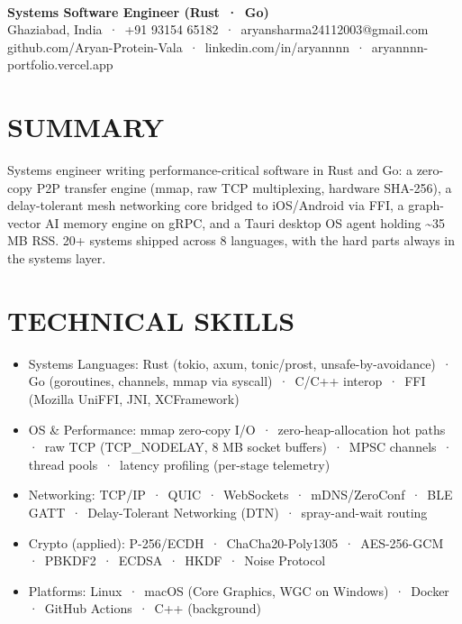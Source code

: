 \documentclass[9pt]{article}
\begin{document}
\\[3pt]
{\large\bfseries Systems Software Engineer (Rust \,·\, Go)}\\[3pt]
{\small\color{greyc} Ghaziabad, India \,·\, +91 93154 65182 \,·\, aryansharma24112003@gmail.com}\vspace{-2pt}
{\small\color{greyc} github.com/Aryan-Protein-Vala \,·\, linkedin.com/in/aryannnn \,·\, aryannnn-portfolio.vercel.app}\vspace{-2pt}
\section*{SUMMARY}
Systems engineer writing performance-critical software in Rust and Go: a zero-copy P2P transfer engine (mmap, raw TCP multiplexing, hardware SHA-256), a delay-tolerant mesh networking core bridged to iOS/Android via FFI, a graph-vector AI memory engine on gRPC, and a Tauri desktop OS agent holding \textasciitilde{}35 MB RSS. 20+ systems shipped across 8 languages, with the hard parts always in the systems layer.
\vspace{1pt}
\section*{TECHNICAL SKILLS}
\begin{itemize}[leftmargin=11pt,itemsep=0pt,topsep=1pt,parsep=0pt]
\item Systems Languages: Rust (tokio, axum, tonic/prost, unsafe-by-avoidance) \,·\, Go (goroutines, channels, mmap via syscall) \,·\, C/C++ interop \,·\, FFI (Mozilla UniFFI, JNI, XCFramework)
\item OS \& Performance: mmap zero-copy I/O \,·\, zero-heap-allocation hot paths \,·\, raw TCP (TCP\_NODELAY, 8 MB socket buffers) \,·\, MPSC channels \,·\, thread pools \,·\, latency profiling (per-stage telemetry)
\item Networking: TCP/IP \,·\, QUIC \,·\, WebSockets \,·\, mDNS/ZeroConf \,·\, BLE GATT \,·\, Delay-Tolerant Networking (DTN) \,·\, spray-and-wait routing
\item Crypto (applied): P-256/ECDH \,·\, ChaCha20-Poly1305 \,·\, AES-256-GCM \,·\, PBKDF2 \,·\, ECDSA \,·\, HKDF \,·\, Noise Protocol
\item Platforms: Linux \,·\, macOS (Core Graphics, WGC on Windows) \,·\, Docker \,·\, GitHub Actions \,·\, C++ (background)
\end{itemize}
\end{document}
